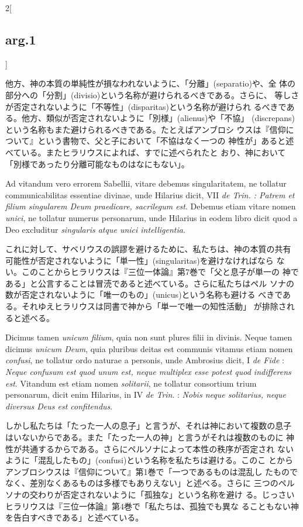 \documentclass[paper=a4paper,fontsize=10pt,jafontsize=9pt,titlepage]{jlreq}
\begin{document}
\begin{paracol}{2}[\subsection{arg.1}]
\switchcolumn

他方、神の本質の単純性が損なわれないように、「分離」(separatio)や、全
 体の部分への「分割」(divisio)という名称が避けられるべきである。さらに、
 等しさが否定されないように「不等性」(disparitas)という名称が避けられ
 るべきである。他方、類似が否定されないように「別様」(alienus)や「不協」
 (discrepans)という名称もまた避けられるべきである。たとえばアンブロシ
 ウスは『信仰について』という書物で、父と子において「不協はなく一つの
 神性が」あると述べている。またヒラリウスによれば、すでに述べられたと
 おり、神において「別様であったり分離可能なものはなにもない」。

\switchcolumn*

Ad vitandum vero errorem Sabellii, vitare debemus
singularitatem, ne tollatur communicabilitas essentiae divinae, unde
Hilarius dicit, VII {\itshape de Trin. : Patrem et filium singularem Deum
praedicare, sacrilegum est}. Debemus etiam vitare nomen {\itshape unici}, ne
tollatur numerus personarum, unde Hilarius in eodem libro dicit quod a
Deo excluditur {\itshape singularis atque unici intelligentia}.

\switchcolumn

これに対して、サベリウスの誤謬を避けるために、私たちは、神の本質の共有
 可能性が否定されないように「単一性」(singularitas)を避けなければなら
 ない。このことからヒラリウスは『三位一体論』第7巻で「父と息子が単一の
 神である」と公言することは冒涜であると述べている。さらに私たちはペル
 ソナの数が否定されないように「唯一のもの」(unicus)という名称も避ける
 べきである。それゆえヒラリウスは同書で神から「単一で唯一の知性活動」
 が排除されると述べる。

\switchcolumn*

Dicimus tamen
{\itshape unicum filium}, quia non sunt plures filii in divinis. Neque tamen
dicimus {\itshape unicum Deum}, quia pluribus deitas est communis vitamus etiam
nomen {\itshape confusi}, ne tollatur ordo naturae a personis, unde Ambrosius
dicit, I {\itshape de Fide} : {\itshape Neque confusum est quod unum est, neque multiplex
esse potest quod indifferens est}. Vitandum est etiam nomen {\itshape solitarii},
ne tollatur consortium trium personarum, dicit enim Hilarius, in IV {\itshape de
Trin}. : {\itshape Nobis neque solitarius, neque diversus Deus est
confitendus}.

\switchcolumn

しかし私たちは「たった一人の息子」と言うが、それは神において複数の息子
 はいないからである。また「たった一人の神」と言うがそれは複数のものに
 神性が共通するからである。さらにペルソナによって本性の秩序が否定され
 ないように「混乱したもの」(confusi)という名称を私たちは避ける。このこ
 とからアンブロシウスは『信仰について』第1巻で「一つであるものは混乱し
 たものでなく、差別なくあるものは多様でもありえない」と述べる。さらに
 三つのペルソナの交わりが否定されないように「孤独な」という名称を避け
 る。じっさいヒラリウスは『三位一体論』第4巻で「私たちは、孤独でも異な
 ることもない神を告白すべきである」と述べている。


\end{paracol}
\end{document}
